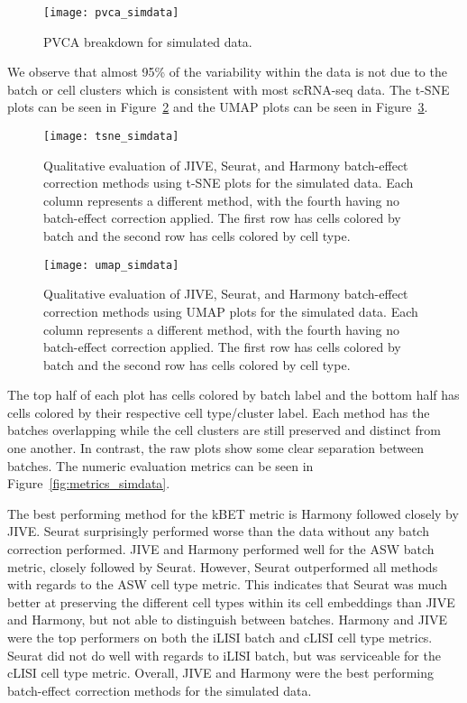 \documentclass[
12pt, %
letterpaper, %
oneside, %
headinclude,footinclude, %
BCOR5mm, %
]{scrartcl}
\begin{document}
\begin{figure}[ht]
    \centering 
    \texttt{[image: pvca\_simdata]} 
    \caption[PVCA Breakdown for Simulated Data]{PVCA breakdown for simulated data.}
    \label{fig:pvca_simdata} 
\end{figure}

We observe that almost 95\% of the variability within the data is not due to the batch or cell clusters which is consistent with most scRNA-seq data. The t-SNE plots can be seen in Figure~\ref{fig:tsne_simdata} and the UMAP plots can be seen in Figure~\ref{fig:umap_simdata}.

\begin{figure}[H]
    \centering 
    \texttt{[image: tsne\_simdata]} 
    \caption[t-SNE Plots for Simulated Data]{Qualitative evaluation of JIVE, Seurat, and Harmony batch-effect correction methods using t-SNE plots for the simulated data. Each column represents a different method, with the fourth having no batch-effect correction applied. The first row has cells colored by batch and the second row has cells colored by cell type.}
    \label{fig:tsne_simdata}
\end{figure}

\begin{figure}[H]
    \centering 
    \texttt{[image: umap\_simdata]} 
    \caption[UMAP Plots for Simulated Data]{Qualitative evaluation of JIVE, Seurat, and Harmony batch-effect correction methods using UMAP plots for the simulated data. Each column represents a different method, with the fourth having no batch-effect correction applied. The first row has cells colored by batch and the second row has cells colored by cell type.}
    \label{fig:umap_simdata} 
\end{figure}

The top half of each plot has cells colored by batch label and the bottom half has cells colored by their respective cell type/cluster label. Each method has the batches overlapping while the cell clusters are still preserved and distinct from one another. In contrast, the raw plots show some clear separation between batches. The numeric evaluation metrics can be seen in Figure~\ref{fig:metrics_simdata}.

The best performing method for the kBET metric is Harmony followed closely by JIVE. Seurat surprisingly performed worse than the data without any batch correction performed. JIVE and Harmony performed well for the ASW batch metric, closely followed by Seurat. However, Seurat outperformed all methods with regards to the ASW cell type metric. This indicates that Seurat was much better at preserving the different cell types within its cell embeddings than JIVE and Harmony, but not able to distinguish between batches. Harmony and JIVE were the top performers on both the iLISI batch and cLISI cell type metrics. Seurat did not do well with regards to iLISI batch, but was serviceable for the cLISI cell type metric. Overall, JIVE and Harmony were the best performing batch-effect correction methods for the simulated data.
\end{document}
